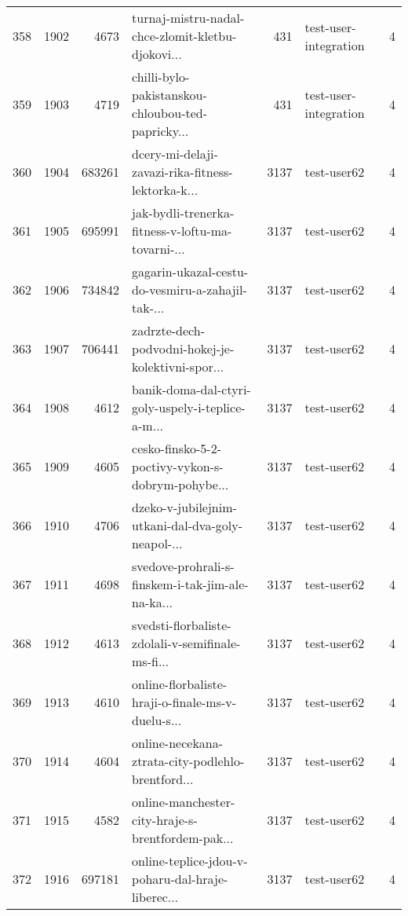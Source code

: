 \begin{tabular}{lrrlrlr}
358  &       1902 &     4673 &  turnaj-mistru-nadal-chce-zlomit-kletbu-djokovi... &      431 &        test-user-integration &               4 \\
359  &       1903 &     4719 &  chilli-bylo-pakistanskou-chloubou-ted-papricky... &      431 &        test-user-integration &               4 \\
360  &       1904 &   683261 &  dcery-mi-delaji-zavazi-rika-fitness-lektorka-k... &     3137 &                  test-user62 &               4 \\
361  &       1905 &   695991 &  jak-bydli-trenerka-fitness-v-loftu-ma-tovarni-... &     3137 &                  test-user62 &               4 \\
362  &       1906 &   734842 &  gagarin-ukazal-cestu-do-vesmiru-a-zahajil-tak-... &     3137 &                  test-user62 &               4 \\
363  &       1907 &   706441 &  zadrzte-dech-podvodni-hokej-je-kolektivni-spor... &     3137 &                  test-user62 &               4 \\
364  &       1908 &     4612 &  banik-doma-dal-ctyri-goly-uspely-i-teplice-a-m... &     3137 &                  test-user62 &               4 \\
365  &       1909 &     4605 &  cesko-finsko-5-2-poctivy-vykon-s-dobrym-pohybe... &     3137 &                  test-user62 &               4 \\
366  &       1910 &     4706 &  dzeko-v-jubilejnim-utkani-dal-dva-goly-neapol-... &     3137 &                  test-user62 &               4 \\
367  &       1911 &     4698 &  svedove-prohrali-s-finskem-i-tak-jim-ale-na-ka... &     3137 &                  test-user62 &               4 \\
368  &       1912 &     4613 &  svedsti-florbaliste-zdolali-v-semifinale-ms-fi... &     3137 &                  test-user62 &               4 \\
369  &       1913 &     4610 &  online-florbaliste-hraji-o-finale-ms-v-duelu-s... &     3137 &                  test-user62 &               4 \\
370  &       1914 &     4604 &  online-necekana-ztrata-city-podlehlo-brentford... &     3137 &                  test-user62 &               4 \\
371  &       1915 &     4582 &  online-manchester-city-hraje-s-brentfordem-pak... &     3137 &                  test-user62 &               4 \\
372  &       1916 &   697181 &  online-teplice-jdou-v-poharu-dal-hraje-liberec... &     3137 &                  test-user62 &               4 \\

\end{tabular}
